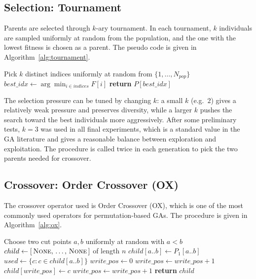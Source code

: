 \documentclass [a4paper, 11pt, titlepage] {article}
\begin{document}
\subsection{Selection: Tournament}
\label{sec:selection}

Parents are selected through $k$-ary tournament. In each tournament, $k$ individuals are sampled uniformly at random from the population, and the one with the lowest fitness is chosen as a parent. The pseudo code is given in Algorithm~\ref{alg:tournament}.

\begin{algorithm}[H]
\caption{Tournament Selection}
\label{alg:tournament}
\begin{algorithmic}[1]
    \STATE Pick $k$ distinct indices uniformly at random from $\{1, \ldots, N_{pop}\}$
    \STATE $best\_idx \gets \arg\min_{i \in indices} F[i]$
    \STATE \textbf{return} $P[best\_idx]$
\end{algorithmic}
\end{algorithm}

The selection pressure can be tuned by changing $k$: a small $k$ (e.g.\ $2$) gives a relatively weak pressure and preserves diversity, while a larger $k$ pushes the search toward the best individuals more aggressively. After some preliminary tests, $k = 3$ was used in all final experiments, which is a standard value in the GA literature and gives a reasonable balance between exploration and exploitation. The procedure is called twice in each generation to pick the two parents needed for crossover.

\subsection{Crossover: Order Crossover (OX)}
\label{sec:ox}

The crossover operator used is Order Crossover (OX), which is one of the most commonly used operators for permutation-based GAs. The procedure is given in Algorithm~\ref{alg:ox}.

\begin{algorithm}[H]
\caption{Order Crossover (OX)}
\label{alg:ox}
\begin{algorithmic}[1]
    \STATE Choose two cut points $a, b$ uniformly at random with $a < b$
    \STATE $child \gets [\,\textsc{None},\, \ldots,\, \textsc{None}\,]$ of length $n$
    \STATE $child[a..b] \gets P_1[a..b]$ 
    \STATE $used \gets \{ c : c \in child[a..b] \}$
    \STATE $write\_pos \gets 0$
                \STATE $write\_pos \gets write\_pos + 1$
            \ENDWHILE
            \STATE $child[write\_pos] \gets c$
            \STATE $write\_pos \gets write\_pos + 1$
        \ENDIF
    \ENDFOR
    \STATE \textbf{return} $child$
\end{algorithmic}
\end{algorithm}
\end{document}
